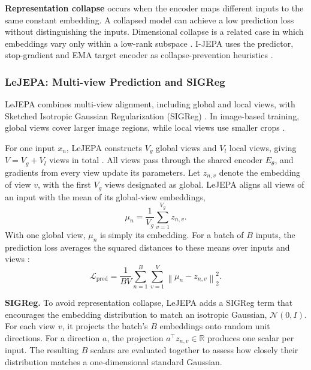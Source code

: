 \textbf{Representation collapse} occurs when the encoder maps different inputs to the same constant embedding. A collapsed model can achieve a low prediction loss without distinguishing the inputs. Dimensional collapse is a related case in which embeddings vary only within a low-rank subspace \citep{balestriero2025lejepa}. I-JEPA uses the predictor, stop-gradient and EMA target encoder as collapse-prevention heuristics \citep{assran2023ijepa}.

\subsubsection{LeJEPA: Multi-view Prediction and SIGReg}
\label{sec:background-lejepa}

LeJEPA combines multi-view alignment, including global and local views, with Sketched Isotropic Gaussian Regularization (SIGReg) \citep{balestriero2025lejepa}.
In image-based training, global views cover larger image regions, while local views use smaller crops \citep{caron2021dino,kuhn2026levjepaefficientscalable}.

For one input $x_n$, LeJEPA constructs $V_g$ global views and $V_l$ local views, giving $V=V_g+V_l$ views in total \citep{balestriero2025lejepa,kuhn2026levjepaefficientscalable}. All views pass through the shared encoder $E_\theta$, and gradients from every view update its parameters. Let $z_{n,v}$ denote the embedding of view $v$, with the first $V_g$ views designated as global. LeJEPA aligns all views of an input with the mean of its global-view embeddings,
\begin{equation}
\mu_n=\frac{1}{V_g}\sum_{v=1}^{V_g}z_{n,v}.
\label{eq:background-lejepa-global-mean}
\end{equation}
With one global view, $\mu_n$ is simply its embedding. For a batch of $B$ inputs, the prediction loss averages the squared distances to these means over inputs and views \citep[Equation 7 and Section 5.1]{balestriero2025lejepa}:
\begin{equation}
\mathcal{L}_{\mathrm{pred}}
=\frac{1}{BV}\sum_{n=1}^{B}\sum_{v=1}^{V}
\left\|\mu_n-z_{n,v}\right\|_2^2.
\label{eq:background-lejepa-batch}
\end{equation}

\textbf{SIGReg.} To avoid representation collapse, LeJEPA adds a SIGReg term that encourages the embedding distribution to match an isotropic Gaussian, $\mathcal{N}(0,I)$. For each view $v$, it projects the batch's $B$ embeddings onto random unit directions. For a direction $a$, the projection $a^\top z_{n,v}\in\mathbb{R}$ produces one scalar per input. The resulting $B$ scalars are evaluated together to assess how closely their distribution matches a one-dimensional standard Gaussian.

